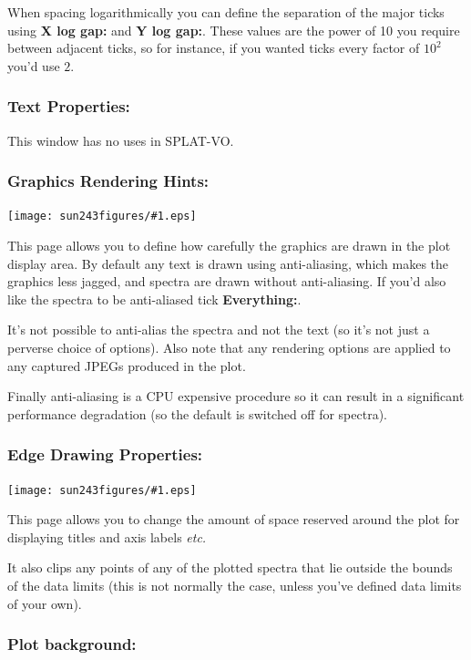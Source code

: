 \documentclass[twoside,11pt]{article}
\newcommand{\htmladdimg}[1]{}
\newcommand{\latexhtml}[2]{#1}
\renewcommand{\_}{\texttt{\symbol{95}}}
\newcommand{\SPLAT}{\textsf{SPLAT-VO}}
\newcommand{\mainfigure}[1]
{\begin{center}
 \latexhtml{\texttt{[image: sun243\_figures/\#1.eps]}}{\htmladdimg{#1.gif}}
 \end{center}
}
\newcommand{\labelitem}[1]{\textbf{#1}}
\newcommand{\etc}{\textit{etc.}}
\begin{document}
When spacing logarithmically you can define the separation of the major ticks
using \labelitem{X log gap:} and \labelitem{Y log gap:}. These values are
the power of 10 you require between adjacent ticks, so for instance, if you
wanted ticks every factor of $10^2$ you'd use $2$.

\newpage
\subsubsection*{Text Properties:}

This window has no uses in \SPLAT.

\newpage
\subsubsection*{Graphics Rendering Hints:}

\mainfigure{configurewindowrender}

This page allows you to define how carefully the graphics are drawn in the
plot display area. By default any text is drawn using anti-aliasing, which
makes the graphics less jagged, and spectra are drawn without
anti-aliasing. If you'd also like the spectra to be anti-aliased tick
\labelitem{Everything:}.

It's not possible to anti-alias the spectra and not the text (so it's
not just a perverse choice of options). Also note that any rendering
options are applied to any captured JPEGs produced in the plot.

Finally anti-aliasing is a CPU expensive procedure so it can result in
a significant performance degradation (so the default is switched off
for spectra).

\newpage
\subsubsection*{Edge Drawing Properties:}

\mainfigure{configurewindowedges}

This page allows you to change the amount of space reserved around the
plot for displaying titles and axis labels \etc\

It also clips any points of any of the plotted spectra that lie
outside the bounds of the data limits (this is not normally the case,
unless you've defined data limits of your own).

\newpage
\subsubsection*{Plot background:}
\end{document}
